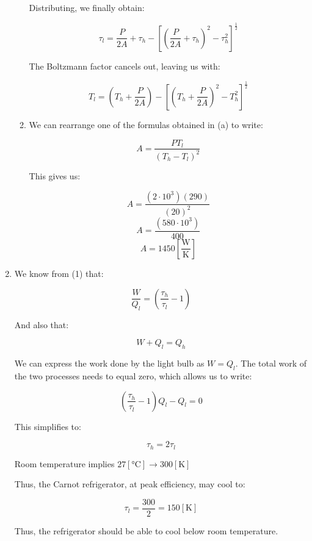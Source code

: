 \begin{enumerate}
\begin{enumerate}
        Distributing, we finally obtain:

        $$\tau_l=\frac{P}{2A}+\tau_h-\left[ \left( \frac{P}{2A}+\tau_h \right)^2-\tau_h^2 \right]^{\frac{1}{2}}$$

        The Boltzmann factor cancels out, leaving us with:

        $$\boxed{T_l=\left(T_h+\frac{P}{2A}\right)-\left[ \left( T_h+\frac{P}{2A} \right)^2-T_h^2 \right]^{\frac{1}{2}}}$$

      \item 

        We can rearrange one of the formulas obtained in (a) to write:

        $$A=\frac{PT_l}{\left( T_h-T_l \right)^2}$$

        This gives us:

        $$A=\frac{(2\cdot10^3)(290)}{(20)^2}$$
        $$A=\frac{(580\cdot10^3)}{400}$$
        $$\boxed{A=1450\left[ \frac{\si{\watt}}{\si{\kelvin}} \right]}$$

    \end{enumerate}

  \item

    We know from (1) that:

    $$\frac{W}{Q_l}=\left( \frac{\tau_h}{\tau_l}-1 \right)$$

    And also that:

    $$W+Q_l=Q_h$$

    We can express the work done by the light bulb as $W=Q_l$. The total work of the two processes needs to equal zero, which allows us to write:

    $$\left( \frac{\tau_h}{\tau_l}-1 \right)Q_l-Q_l=0$$

    This simplifies to:

    $$\tau_h=2\tau_l$$

    Room temperature implies $27[\si{\celsius}]\to300[\si{\kelvin}]$

    Thus, the Carnot refrigerator, at peak efficiency, may cool to:

    $$\boxed{\tau_l=\frac{300}{2}=150[\si{\kelvin}]}$$

    Thus, the refrigerator should be able to cool below room temperature.

\end{enumerate}



